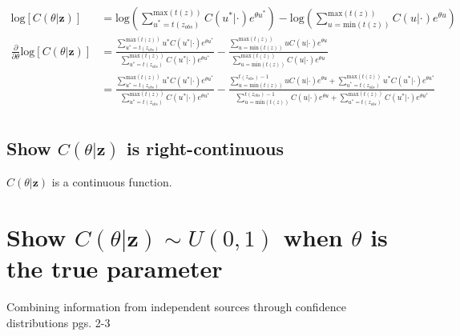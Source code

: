 \documentclass{article}
\begin{document}
\begin{align*}
  \text{log}[C(\theta|\textbf{z})] &= 
  \text{log}\left(
    \sum_{u^*=t(z_{obs})}^{\text{max}(t(z))} C(u^*|\cdot)e^{\theta u^*} 
  \right) - 
  \text{log}\left(
    \sum_{u=\text{min}(t(z))}^{\text{max}(t(z))} C(u|\cdot)e^{\theta u}
  \right) \\
  \frac{\partial}{\partial \theta} \text{log}[C(\theta|\textbf{z})] &= 
  \frac
  {\sum_{u^*=t(z_{obs})}^{\text{max}(t(z))} u^* C(u^*|\cdot)e^{\theta u^*}}
  {\sum_{u^*=t(z_{obs})}^{\text{max}(t(z))} C(u^*|\cdot)e^{\theta u^*}} -
  \frac
  {\sum_{u=\text{min}(t(z))}^{\text{max}(t(z))} u C(u|\cdot)e^{\theta u}}
  {\sum_{u=\text{min}(t(z))}^{\text{max}(t(z))} C(u|\cdot)e^{\theta u}} \\
  &= 
  \frac
  {\sum_{u^*=t(z_{obs})}^{\text{max}(t(z))} u^* C(u^*|\cdot)e^{\theta u^*}}
  {\sum_{u^*=t(z_{obs})}^{\text{max}(t(z))} C(u^*|\cdot)e^{\theta u^*}} -
  \frac
  {\sum_{u=\text{min}(t(z))}^{t(z_{obs})-1} u C(u|\cdot)e^{\theta u} + 
  \sum_{u^*=t(z_{obs})}^{\text{max}(t(z))} u^* C(u^*|\cdot)e^{\theta u^*}}
  {\sum_{u=\text{min}(t(z))}^{t(z_{obs})-1} C(u|\cdot)e^{\theta u} + 
  \sum_{u^*=t(z_{obs})}^{\text{max}(t(z))} C(u^*|\cdot)e^{\theta u^*}} \\
\end{align*}

\subsection{Show $C(\theta|\textbf{z})$ is right-continuous}
$C(\theta|\textbf{z})$ is a continuous function. 

\section{Show $C(\theta|\textbf{z}) \sim U(0, 1)$ when $\theta$ is the true parameter}
Combining information from independent sources through confidence distributions
pgs. 2-3
\end{document}
